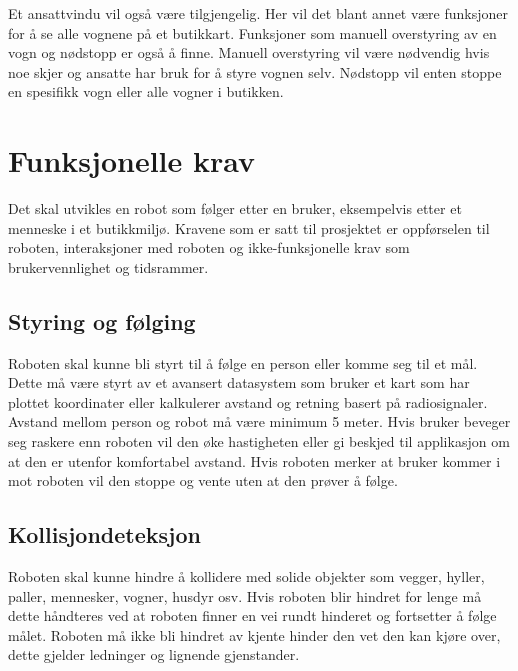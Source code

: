 Et ansattvindu vil også være tilgjengelig. Her vil det blant annet være funksjoner for å se alle vognene på et butikkart. Funksjoner som manuell overstyring av en vogn og nødstopp er også å finne. Manuell overstyring vil være nødvendig hvis noe skjer og ansatte har bruk for å styre vognen selv. Nødstopp vil enten stoppe en spesifikk vogn eller alle vogner i butikken.


\section{Funksjonelle krav}
Det skal utvikles en robot som følger etter en bruker, eksempelvis etter et menneske i et butikkmiljø. Kravene som er satt til prosjektet er oppførselen til roboten, interaksjoner med roboten og ikke-funksjonelle krav som brukervennlighet og tidsrammer. 

\subsection{Styring og følging}
Roboten skal kunne bli styrt til å følge en person eller komme seg til et mål. Dette må være styrt av et avansert datasystem som bruker et kart som har plottet koordinater eller kalkulerer avstand og retning basert på radiosignaler. Avstand mellom person og robot må være minimum 5 meter. Hvis bruker beveger seg raskere enn roboten vil den øke hastigheten eller gi beskjed til applikasjon om at den er utenfor komfortabel avstand. Hvis roboten merker at bruker kommer i mot roboten vil den stoppe og vente uten at den prøver å følge.

\subsection{Kollisjondeteksjon}
Roboten skal kunne hindre å kollidere med solide objekter som vegger, hyller, paller, mennesker, vogner, husdyr osv. Hvis roboten blir hindret for lenge må dette håndteres ved at roboten finner en vei rundt hinderet og fortsetter å følge målet. Roboten må ikke bli hindret av kjente hinder den vet den kan kjøre over, dette gjelder ledninger og lignende gjenstander.


